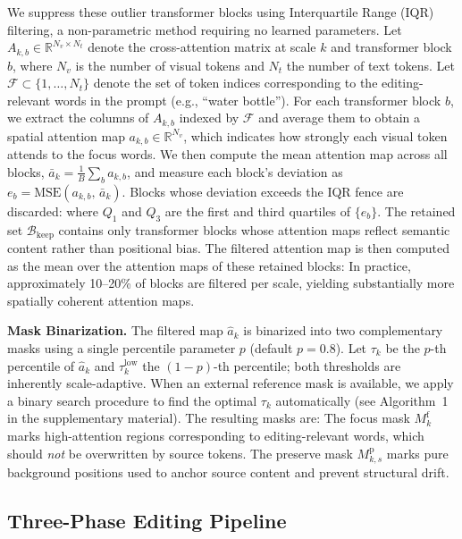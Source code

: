 We suppress these outlier transformer blocks using Interquartile Range (IQR) filtering, a non-parametric method requiring no learned parameters. Let $A_{k,b} \in \mathbb{R}^{N_v \times N_t}$ denote the cross-attention matrix at scale $k$ and transformer block $b$, where $N_v$ is the number of visual tokens and $N_t$ the number of text tokens. Let $\mathcal{F} \subset \{1, \ldots, N_t\}$ denote the set of token indices corresponding to the editing-relevant words in the prompt (e.g., ``water bottle''). For each transformer block $b$, we extract the columns of $A_{k,b}$ indexed by $\mathcal{F}$ and average them to obtain a spatial attention map $a_{k,b} \in \mathbb{R}^{N_v}$, which indicates how strongly each visual token attends to the focus words. We then compute the mean attention map across all blocks, $\bar{a}_k = \frac{1}{B}\sum_{b} a_{k,b}$, and measure each block's deviation as $e_b = \mathrm{MSE}(a_{k,b},\, \bar{a}_k)$. Blocks whose deviation exceeds the IQR fence are discarded:
\EqIqrFilter
where $Q_1$ and $Q_3$ are the first and third quartiles of $\{e_b\}$. The retained set $\mathcal{B}_{\mathrm{keep}}$ contains only transformer blocks whose attention maps reflect semantic content rather than positional bias. The filtered attention map is then computed as the mean over the attention maps of these retained blocks:
\EqFilteredAttn
In practice, approximately 10--20\% of blocks are filtered per scale, yielding substantially more spatially coherent attention maps.

\noindent\textbf{Mask Binarization.}
The filtered map $\hat{a}_k$ is binarized into two complementary masks using a single percentile parameter $p$ (default $p{=}0.8$). Let $\tau_k$ be the $p$-th percentile of $\hat{a}_k$ and $\tau_k^{\mathrm{low}}$ the $(1{-}p)$-th percentile; both thresholds are inherently scale-adaptive. When an external reference mask is available, we apply a binary search procedure to find the optimal $\tau_k$ automatically (see Algorithm~1 in the supplementary material). The resulting masks are:
\EqMasks
The focus mask $M_k^{\mathrm{f}}$ marks high-attention regions corresponding to editing-relevant words, which should \textit{not} be overwritten by source tokens. The preserve mask $M_{k,s}^{\mathrm{p}}$ marks pure background positions used to anchor source content and prevent structural drift.


\subsection{Three-Phase Editing Pipeline}
\label{sec:pipeline}

